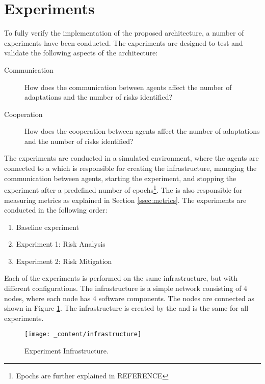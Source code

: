 \section{Experiments}
\label{sec:experiments}
To fully verify the implementation of the proposed architecture, a number of experiments have been conducted. The experiments are designed to test and validate the following aspects of the architecture: 

\begin{description}
    \item[Communication] How does the communication between agents affect the number of adaptations and the number of risks identified?
    \item[Cooperation] How does the cooperation between agents affect the number of adaptations and the number of risks identified?
\end{description}

The experiments are conducted in a simulated environment, where the agents are connected to a  which is responsible for creating the infrastructure, managing the communication between agents, starting the experiment, and stopping the experiment after a predefined number of epochs\footnote{Epochs are further explained in REFERENCE}. The  is also responsible for measuring metrics as explained in Section \ref{ssec:metrics}. The experiments are conducted in the following order:

\begin{enumerate}
    \item Baseline experiment
    \item Experiment 1: Risk Analysis 
    \item Experiment 2: Risk Mitigation 
\end{enumerate}

Each of the experiments is performed on the same infrastructure, but with different configurations.  The infrastructure is a simple network consisting of 4 nodes, where each node has 4 software components. The nodes are connected as shown in Figure \ref{fig:infrastructure}. The infrastructure is created by the  and is the same for all experiments.

\begin{figure}[H]
    \centering
    \texttt{[image: \_content/infrastructure]}
    \caption{Experiment Infrastructure.}
    \label{fig:infrastructure}
\end{figure}

